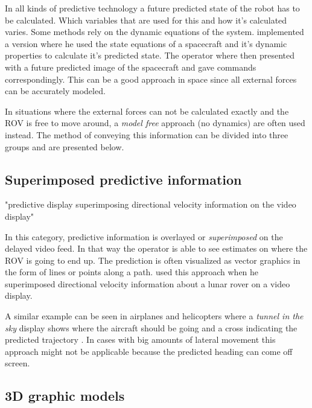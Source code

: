 In all kinds of predictive technology a future predicted state of the robot has to be calculated. Which variables that are used for this and how it's calculated varies. Some methods rely on the dynamic equations of the system. \citep{Zhang2017} implemented a version where he used the state equations of a spacecraft and it's dynamic properties to calculate it's predicted state. The operator where then presented with a future predicted image of the spacecraft and gave commands correspondingly. This can be a good approach in space since all external forces can be accurately modeled.

In situations where the external forces can not be calculated exactly and the ROV is free to move around, a \emph{model free} approach (no dynamics) are often used instead. The method of conveying this information can be divided into three groups and are presented below.




\subsection{Superimposed predictive information}

\citep{Mathan1996} "predictive display superimposing directional
velocity information on the video display"

In this category, predictive information is overlayed or \emph{superimposed} on the delayed video feed. In that way the operator is able to see estimates on where the ROV is going to end up. The prediction is often visualized as vector graphics in the form of lines or points along a path. \citep{Mathan1996} used this approach when he superimposed directional velocity information about a lunar rover on a video display.

A similar example can be seen in airplanes and helicopters where a \emph{tunnel in the sky} display shows where the aircraft should be going and a cross indicating the predicted trajectory \citep{Grunwald1981}. In cases with big amounts of lateral movement this approach might not be applicable because the predicted heading can come off screen.

\subsection{3D graphic models}


